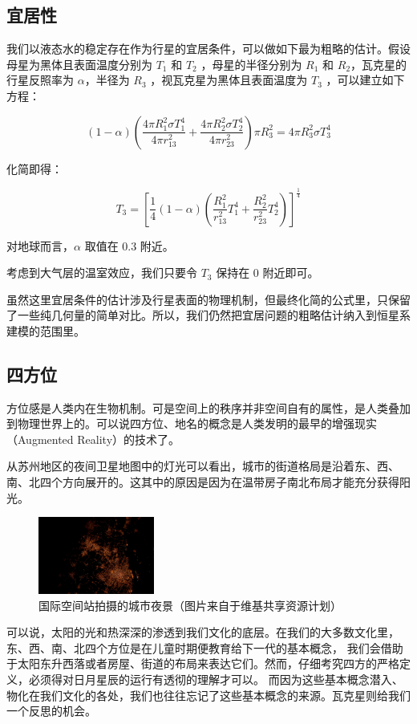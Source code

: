 \documentclass[a4paper,10.5pt]{article}
\begin{document}
\subsection{宜居性}

我们以液态水的稳定存在作为行星的宜居条件，可以做如下最为粗略的估计。假设母星为黑体且表面温度分别为 $T_1$ 和 $T_2$ ，母星的半径分别为 $R_1$ 和 $R_2$，瓦克星的行星反照率为 $\alpha$，半径为 $R_3$ ，视瓦克星为黑体且表面温度为 $T_3$  ，可以建立如下方程：

$$\left ( 1 - \alpha \right ) \left(  \frac{4 \pi R_1^2 \sigma T_1^4} {4 \pi r_{13}^2} + \frac{4 \pi R_2^2 \sigma T_2^4} {4 \pi r_{23}^2} \right ) \pi R_3^2= 4 \pi R_3^2 \sigma T_3^4$$

化简即得：

$$T_3 = \left[ \frac{1}{4} \left( 1 - \alpha \right ) \left( \frac{R_1^2}{r_{13}^2} T_1^4 + \frac{R_2^2}{r_{23}^2} T_2^4 \right ) \right ]^{\frac{1}{4}}$$

对地球而言，$\alpha$ 取值在 0.3 附近。

考虑到大气层的温室效应，我们只要令 $T_3$ 保持在 0 附近即可。

虽然这里宜居条件的估计涉及行星表面的物理机制，但最终化简的公式里，只保留了一些纯几何量的简单对比。所以，我们仍然把宜居问题的粗略估计纳入到恒星系建模的范围里。

\subsection{四方位}

方位感是人类内在生物机制。可是空间上的秩序并非空间自有的属性，是人类叠加到物理世界上的。可以说四方位、地名的概念是人类发明的最早的增强现实（Augmented Reality）的技术了。

从苏州地区的夜间卫星地图中的灯光可以看出，城市的街道格局是沿着东、西、南、北四个方向展开的。这其中的原因是因为在温带房子南北布局才能充分获得阳光。

\begin{figure}[ht]
\centering
\includegraphics[width=1.5in]{images/4_01-ISS-30_Nighttime_view_of_Shanghai.jpg}
\caption{国际空间站拍摄的城市夜景（图片来自于维基共享资源计划）}
\end{figure}

可以说，太阳的光和热深深的渗透到我们文化的底层。在我们的大多数文化里，东、西、南、北四个方位是在儿童时期便教育给下一代的基本概念，
我们会借助于太阳东升西落或者房屋、街道的布局来表达它们。然而，仔细考究四方的严格定义，必须得对日月星辰的运行有透彻的理解才可以。
而因为这些基本概念潜入、物化在我们文化的各处，我们也往往忘记了这些基本概念的来源。瓦克星则给我们一个反思的机会。
\end{document}

